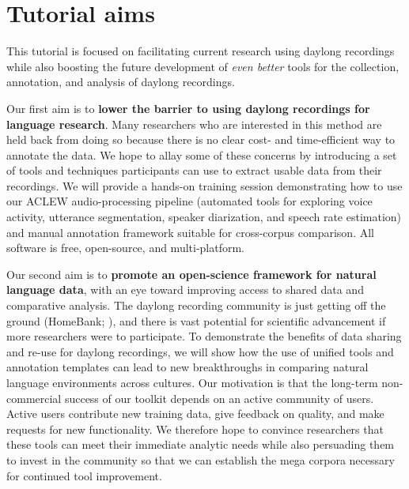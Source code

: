 \documentclass[10pt,letterpaper]{article}
\begin{document}
\section{Tutorial aims}
This tutorial is focused on facilitating current research using daylong recordings while also boosting the future development of \textit{even better} tools for the collection, annotation, and analysis of daylong recordings.

Our first aim is to \textbf{lower the barrier to using daylong recordings for language research}. Many researchers who are interested in this method are held back from doing so because there is no clear cost- and time-efficient way to annotate the data. We hope to allay some of these concerns by introducing a set of tools and techniques participants can use to extract usable data from their recordings. We will provide a hands-on training session demonstrating how to use our ACLEW audio-processing pipeline (automated tools for exploring voice activity, utterance segmentation, speaker diarization, and speech rate estimation) and manual annotation framework suitable for cross-corpus comparison. All software is free, open-source, and multi-platform.

Our second aim is to \textbf{promote an open-science framework for natural language data}, with an eye toward improving access to shared data and comparative analysis. The daylong recording community is just getting off the ground (HomeBank; ), and there is vast potential for scientific advancement if more researchers were to participate. To demonstrate the benefits of data sharing and re-use for daylong recordings, %
we will show how the use of unified tools and annotation templates can lead to new breakthroughs in comparing natural language environments across cultures.
Our motivation is that the long-term non-commercial success of our toolkit depends on an active community of users. Active users contribute new training data, give feedback on quality, and make requests for new functionality. We therefore hope to convince researchers that these tools can meet their immediate analytic needs while also persuading them to invest in the community so that we can establish the mega corpora necessary for continued tool improvement.
\end{document}
